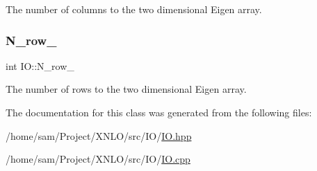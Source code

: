 The number of columns to the two dimensional Eigen array. \mbox{\label{class_i_o_ab8aa1490df2e2e758766030afdae3a40}} 
\subsubsection{\texorpdfstring{N\+\_\+row\+\_\+}{N\_row\_}}
{\footnotesize\ttfamily int I\+O\+::\+N\+\_\+row\+\_\+}

The number of rows to the two dimensional Eigen array. 

The documentation for this class was generated from the following files\+:\begin{DoxyCompactItemize}
\item 
/home/sam/\+Project/\+X\+N\+L\+O/src/\+I\+O/\hyperlink{_i_o_8hpp}{I\+O.\+hpp}\item 
/home/sam/\+Project/\+X\+N\+L\+O/src/\+I\+O/\hyperlink{_i_o_8cpp}{I\+O.\+cpp}\end{DoxyCompactItemize}
